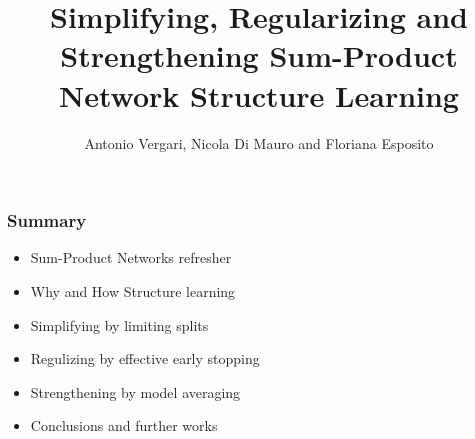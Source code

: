 \documentclass[xcolor={usenames,dvipsnames,svgnames}, compress]{beamer}
\begin{document}
\newlength{\custombulletheight}
\setlength{\custombulletheight}{\dimexpr0.5\ht1-0.5\ht2}

\newcommand{\plusbullet}{\raisebox{\custombulletheight}{\hbox{\tiny\textcolor{lacamlilac}{$\boldsymbol{\oplus}$}}\hspace{-2pt}}}



% 

\title{Simplifying, Regularizing and Strengthening Sum-Product Network Structure Learning}
\author{Antonio  Vergari, Nicola  {Di Mauro} and Floriana Esposito}


{
  \begin{frame}
    \titlepage
  \end{frame}
}

\begin{frame}
  \frametitle{Summary}
  \begin{itemize}
  \item Sum-Product Networks refresher
  \item Why and How Structure learning
  \item Simplifying by limiting splits
  \item Regulizing by effective early stopping
  \item Strengthening by model averaging
    \item Conclusions and further works
  \end{itemize}
\end{frame}
\end{document}
